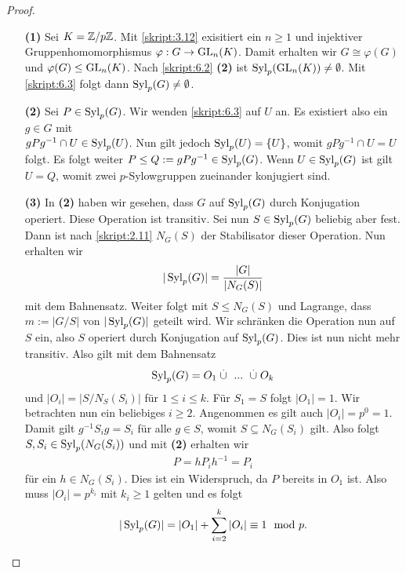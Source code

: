 \begin{proof}\
	\begin{enumerate}
		\item[\textbf{(1)}]
		Sei $K = \mathbb{Z} / p \mathbb{Z}$. Mit \ref{skript:3.12} exisitiert ein $n \geq 1$ und injektiver Gruppenhomomorphismus 
		$\varphi : G \to \operatorname{GL}_n(K)$. Damit erhalten wir $G \cong \varphi(G)$ und $\varphi(G) \leq \operatorname{GL}_n(K)$.
		Nach \ref{skript:6.2} \textbf{(2)} ist $\operatorname{Syl}_p(\operatorname{GL}_n(K)) \neq \emptyset$. 
		Mit \ref{skript:6.3} folgt dann $\operatorname{Syl}_p(G) \neq \emptyset$.		
		
		\item[\textbf{(2)}]
		Sei $P \in \operatorname{Syl}_p(G)$.
		Wir wenden \ref{skript:6.3} auf $U$ an.
		Es existiert also ein $g \in G$ mit \\ 
		$g P g^{-1} \cap U \in \operatorname{Syl}_p(U)$.
		Nun gilt jedoch $\operatorname{Syl}_p(U) = \lbrace U \rbrace$, womit $g P g^{-1} \cap U = U $ folgt.
		Es folgt weiter $P \leq Q:= g P g^{-1} \in \operatorname{Syl}_p(G)$.
		Wenn $U \in \operatorname{Syl}_p(G) $ ist gilt $U = Q$, womit zwei $p$-Sylowgruppen zueinander konjugiert sind. 
		
		\item[\textbf{(3)}] 
		In \textbf{(2)} haben wir gesehen, dass $ G $ auf $ \operatorname{Syl}_p(G) $ durch Konjugation operiert.
		Diese Operation ist transitiv.
		Sei nun $ S \in \operatorname{Syl}_p(G) $ beliebig aber fest. Dann ist nach \ref{skript:2.11} $ N_G(S)  $ der Stabilisator dieser Operation.
		Nun erhalten wir 
		\begin{align*}
		|\operatorname{Syl}_p(G)| = \frac{|G|}{|N_G(S)|}
		\end{align*}
		mit dem Bahnensatz.
		Weiter folgt mit $ S \leq N_G(S) $ und Lagrange, dass $ m := |G/S|$ von $ | \operatorname{Syl}_p(G) |$ geteilt wird.
		Wir schränken die Operation nun auf $ S $ ein, also $ S $ operiert durch Konjugation auf $ \operatorname{Syl}_p(G) $. Dies ist nun nicht mehr transitiv.
		Also gilt mit dem Bahnensatz 
		\begin{align*}
		\operatorname{Syl}_p(G) = O_1 \stackrel{.}{\cup} \  ...  \ \stackrel{.}{\cup} O_k
		\end{align*}
		und $ |O_i| = |S / N_S(S_i) | $ für $ 1 \leq i \leq k $.
		Für $ S_1 = S $ folgt $ |O_1| = 1 $.
		Wir betrachten nun ein beliebiges $ i \geq 2 $.
		Angenommen es gilt auch $ |O_i| = p^0 = 1 $.
		Damit gilt $ g^{-1} S_i g = S_i $ für alle $ g \in S $, womit $ S \subseteq N_G(S_i) $ gilt.
		Also folgt $ S,S_i \in \operatorname{Syl}_p(N_G(S_i)) $ und mit \textbf{(2)} erhalten wir
		\begin{align*}
		P = h P_i h^{-1} = P_i
		\end{align*}
		für ein $ h\in N_G(S_i) $.
		Dies ist ein Widerspruch, da $ P $ bereits in $ O_1 $ ist.
		Also muss $ |O_i| = p^{k_i} $ mit $ k_i \geq 1 $ gelten und es folgt
		\begin{align*}
		|\operatorname{Syl}_p(G)| = |O_1| + \sum \limits_{i=2}^k |O_i| \equiv 1 \mod p.
		\end{align*}
	\end{enumerate}
\end{proof}

